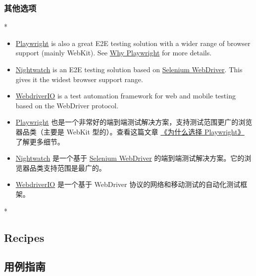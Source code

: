 \begin{paracol}{2}
\subsubsection{其他选项}
\switchcolumn[0]*%
\begin{itemize}
\item
  \href{https://playwright.dev/}{Playwright} is also a great E2E testing
  solution with a wider range of browser support (mainly WebKit). See
  \href{https://playwright.dev/docs/why-playwright}{Why Playwright} for
  more details.
\item
  \href{https://nightwatchjs.org/}{Nightwatch} is an E2E testing
  solution based on
  \href{https://www.npmjs.com/package/selenium-webdriver}{Selenium
  WebDriver}. This gives it the widest browser support range.
\item
  \href{https://webdriver.io/}{WebdriverIO} is a test automation
  framework for web and mobile testing based on the WebDriver protocol.
\end{itemize}
\switchcolumn
\begin{itemize}
\item
  \href{https://playwright.dev/}{Playwright}
  也是一个非常好的端到端测试解决方案，支持测试范围更广的浏览器品类（主要是
  WebKit 型的）。查看这篇文章
  \href{https://playwright.dev/docs/why-playwright}{《为什么选择
  Playwright》} 了解更多细节。
\item
  \href{https://nightwatchjs.org/}{Nightwatch} 是一个基于
  \href{https://www.npmjs.com/package/selenium-webdriver}{Selenium
  WebDriver} 的端到端测试解决方案。它的浏览器品类支持范围是最广的。
\item
  \href{https://webdriver.io/}{WebdriverIO} 是一个基于 WebDriver
  协议的网络和移动测试的自动化测试框架。
\end{itemize}
\switchcolumn[0]*%
\subsection{Recipes}
\switchcolumn
\subsection{用例指南}
\end{paracol}


